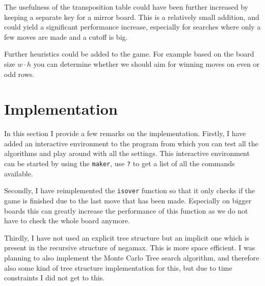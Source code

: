 \documentclass[a4paper]{article}
\begin{document}
The usefulness of the transposition table could have been further increased by
keeping a separate key for a mirror board. This is a relatively small addition,
and could yield a significant performance increase, especially for searches
where only a few moves are made and a cutoff is big.

Further heuristics could be added to the game. For example based on the board
size $w \cdot h$ you can determine whether we should aim for winning moves on
even or odd rows.




\appendix
\section{Implementation}
In this section I provide a few remarks on the implementation. Firstly, I have
added an interactive environment to the program from which you can test all the
algorithms and play around with all the settings. This interactive environment
can be started by using the \texttt{maker}, use \texttt{?} to get a list of all
the commands available.

Secondly, I have reimplemented the \texttt{isover} function so that it only
checks if the game is finished due to the last move that has been made.
Especially on bigger boards this can greatly increase the performance of this
function as we do not have to check the whole board anymore.

Thirdly, I have not used an explicit tree structure but an implicit one which
is present in the recursive structure of negamax. This is more space efficient.
I was planning to also implement the Monte Carlo Tree search algorithm, and
therefore also some kind of tree structure implementation for this, but due to
time constraints I did not get to this.
\end{document}
